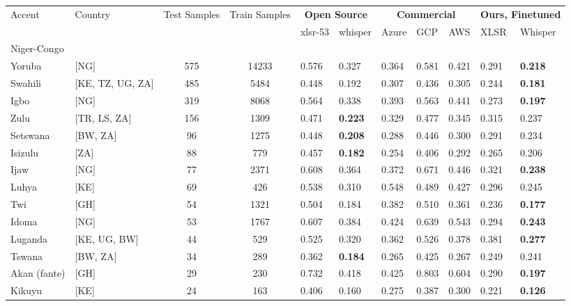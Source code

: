 \documentclass[11pt,a4paper]{article}
\begin{document}
\begin{table*}
\tiny
\centering
\begin{tabular}{l|l|c|c|l|l|l|l|l|l|l|}
\toprule 
Accent & Country & Test Samples & Train Samples & \multicolumn{2}{c|}{\textbf{Open Source}} & \multicolumn{3}{c|}{\textbf{Commercial}} & \multicolumn{2}{c|}{\textbf{Ours, Finetuned}} \\
  &  &  & & xlsr-53 &  whisper & Azure & GCP & AWS & XLSR  & Whisper \\
\midrule
\multicolumn{10}{l}{Niger-Congo}\\
\hline
Yoruba & [NG] & 575 &14233& 0.576 &  0.327 & 0.364 & 0.581 & 0.421 & 0.291 &  \textbf{0.218} \\
Swahili & [KE, TZ, UG, ZA] & 485 &5484 &  0.448 & 0.192 & 0.307 &  0.436 &  0.305 & 0.244 & \textbf{0.181} \\
Igbo & [NG] & 319 &8068& 0.564 & 0.338 & 0.393 &  0.563 &  0.441 & 0.273 & \textbf{0.197} \\
Zulu &  [TR, LS, ZA] & 156 & 1309& 0.471 & \textbf{0.223} & 0.329 &  0.477 &  0.345 &   0.315 &   0.237 \\
Setswana &  [BW, ZA] & 96 &1275&  0.448 &  \textbf{0.208} & 0.288 &  0.446 &  0.300 & 0.291 &  0.234 \\
Isizulu  &  [ZA] & 88 & 779 &    0.457 & \textbf{0.182} &  0.254 &  0.406 &  0.292 & 0.265 &  0.206 \\
Ijaw  &  [NG] & 77 & 2371 &  0.608 & 0.364 & 0.372 &  0.671 &  0.446 & 0.321 &\textbf{0.238} \\
Luhya  &  [KE] & 69 & 426 &   0.538 &0.310 & 0.548 &  0.489 &  0.427 & 0.296 & 0.245 \\
Twi  & [GH] &  54 & 1321 &  0.504 & 0.184 & 0.382 &  0.510 &  0.361 & 0.236 & 
 \textbf{0.177} \\
Idoma  &  [NG] &  53 & 1767 & 0.607 &0.384 & 0.424 &  0.639 &  0.543 & 0.294 &  \textbf{0.243} \\
Luganda &  [KE, UG, BW] & 44 & 529 & 0.525 &0.320 & 0.362 &  0.526 &  0.378 &  0.381 & \textbf{0.277} \\
Tswana       &  [BW, ZA] & 34 & 289 &  0.362 & \textbf{0.184} &   0.265 &  0.425 &  0.267 & 0.249 &  0.241 \\
Akan (fante) & [GH] &  29 & 230 &   0.732  &   0.418 & 0.425 &  0.803 &  0.604 & 0.290  &  \textbf{0.197} \\
Kikuyu &      [KE] &       24 &  163&  0.406 &     0.160 &  0.275 &  0.387 &  0.300 &   0.221 &  \textbf{0.126} \\

\end{tabular}
\end{table*}
\end{document}
